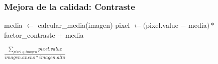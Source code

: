 \documentclass[
10pt, %
aspectratio=169, %
]{beamer}
\begin{document}
	\begin{frame}
		
		\frametitle{Mejora de la calidad: Contraste}
		
		\begin{algorithmic}
				\State media $\gets$ calcular\_media(imagen)
					\State pixel $\gets ($pixel.value $-$ media$) *$ factor\_contraste $+$ media
				\EndFor				
			\EndFunction
			
			
				\Return $\frac{\sum_{pixel \in imagen} pixel.value}{imagen.ancho * imagen.alto}$
			\EndFunction
		\end{algorithmic}
		

\end{frame}
\end{document}
